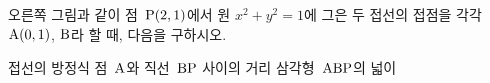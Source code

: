 \noindent\begin{minipage}[t]{0.58\linewidth}\vspace{0pt}\raggedright 오른쪽 그림과 같이 점~$\mathrm{P}(2{,}\mkern3mu\mathopen{}1)$에서 원 $x^2+y^2=1$에 그은 두 접선의 접점을 각각 $\mathrm{A}(0{,}\mkern3mu\mathopen{}1)$, $\mathrm{B}$라 할 때, 다음을 구하시오.\end{minipage}\hfill\begin{minipage}[t]{0.4\linewidth}\vspace{0pt}\centering \resizebox{\ifdim\width>\linewidth\linewidth\else\width\fi}{!}{}\end{minipage}\par
{} 접선의 방정식
 점~$\mathrm{A}$와 직선~$\mathrm{BP}$ 사이의 거리
 삼각형~$\mathrm{ABP}$의 넓이
